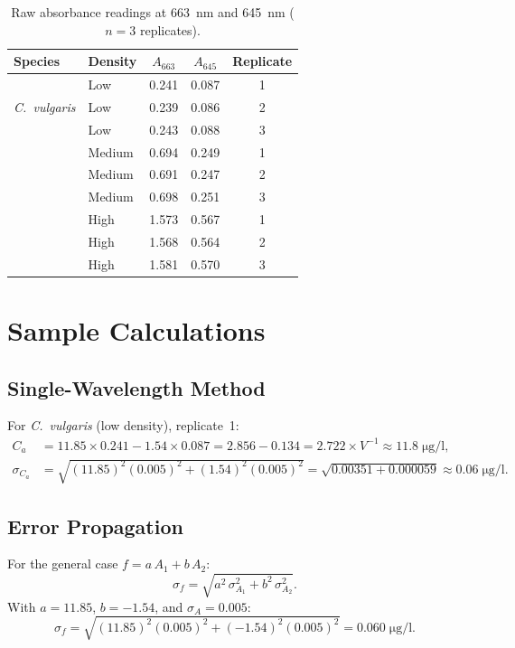 \documentclass[
    language=english,
    doctype=article,
    institution=none,
    titlestyle=book,
]{../../omnilatex}
\begin{document}
\begin{table}[htbp]
    \centering
    \caption{Raw absorbance readings at \SI{663}{\nm} and \SI{645}{\nm}
    ($n = 3$ replicates).}
    \label{tab:rawdata}
    \begin{tabular}{@{}llccc@{}}
        \toprule
        \textbf{Species} & \textbf{Density} & $A_{663}$ & $A_{645}$ &
            \textbf{Replicate} \\
        \midrule
        \multirow{3}{*}{\emph{C.~vulgaris}}
            & Low    & 0.241 & 0.087 & 1 \\
            & Low    & 0.239 & 0.086 & 2 \\
            & Low    & 0.243 & 0.088 & 3 \\
        \addlinespace
        \multirow{3}{*}{\emph{C.~vulgaris}}
            & Medium & 0.694 & 0.249 & 1 \\
            & Medium & 0.691 & 0.247 & 2 \\
            & Medium & 0.698 & 0.251 & 3 \\
        \addlinespace
        \multirow{3}{*}{\emph{C.~vulgaris}}
            & High   & 1.573 & 0.567 & 1 \\
            & High   & 1.568 & 0.564 & 2 \\
            & High   & 1.581 & 0.570 & 3 \\
        \bottomrule
    \end{tabular}
\end{table}

\section{Sample Calculations}
\label{app:calculations}

\subsection{Single-Wavelength Method}
For \emph{C.~vulgaris} (low density), replicate~1:
\begin{align}
    C_{a} &= 11.85 \times 0.241 - 1.54 \times 0.087
           = 2.856 - 0.134 = 2.722 \times V^{-1}
           \approx 11.8 \;\si{\micro\gram\per\litre}, \\
    \sigma_{C_{a}} &= \sqrt{(11.85)^{2}(0.005)^{2} + (1.54)^{2}(0.005)^{2}}
                   = \sqrt{0.00351 + 0.000059}
                   \approx 0.06 \;\si{\micro\gram\per\litre}.
\end{align}

\subsection{Error Propagation}
For the general case $f = a\,A_{1} + b\,A_{2}$:
\begin{equation}
    \sigma_{f} = \sqrt{a^{2}\,\sigma_{A_{1}}^{2} + b^{2}\,\sigma_{A_{2}}^{2}}.
\end{equation}
With $a = 11.85$, $b = -1.54$, and $\sigma_{A} = 0.005$:
\begin{equation}
    \sigma_{f} = \sqrt{(11.85)^{2}(0.005)^{2} + (-1.54)^{2}(0.005)^{2}}
               = 0.060 \;\si{\micro\gram\per\litre}.
\end{equation}
\end{document}
